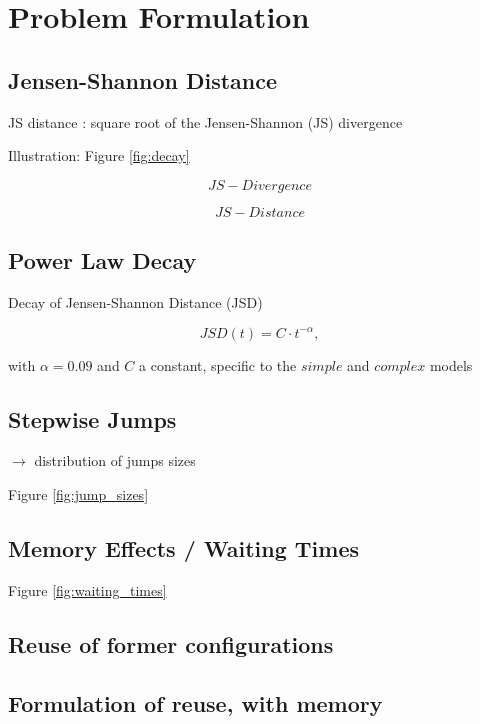 \section{Problem Formulation}


\subsection{Jensen-Shannon Distance}

JS distance : square root of the Jensen-Shannon (JS) divergence

Illustration: Figure \ref{fig:decay}

\begin{equation}
\label{JS-divergence}
JS-Divergence
\end{equation}

\begin{equation}
\label{JS-distance}
JS-Distance
\end{equation}

\subsection{Power Law Decay}

Decay  of Jensen-Shannon Distance (JSD) 

\begin{equation}
\label{power_law_decay}
JSD(t) = C \cdot t^{-\alpha},
\end{equation}

with $\alpha = 0.09$ and $C$ a constant, specific to the $simple$ and $complex$ models

 
\subsection{Stepwise Jumps}

$\rightarrow$ distribution of jumps sizes

Figure \ref{fig:jump_sizes}



\subsection{Memory Effects / Waiting Times}

Figure \ref{fig:waiting_times}


\subsection{Reuse of former configurations}



\subsection{Formulation of reuse, with memory}

